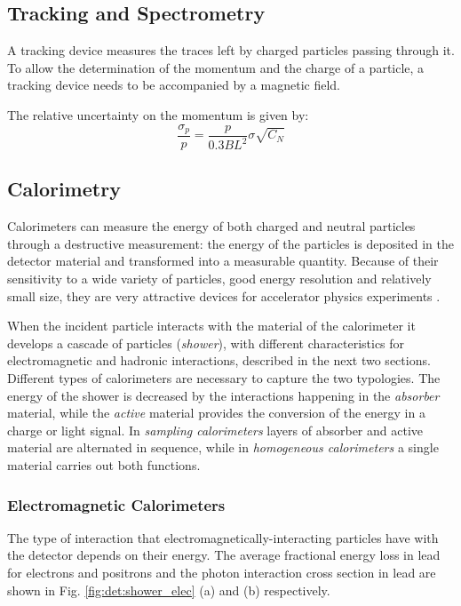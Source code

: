 \subsection{Tracking and Spectrometry}
\label{sec:dec:tracking}
A tracking device measures the traces left by charged particles passing through it. To allow the determination of the momentum and the charge of a particle, a tracking device needs to be accompanied by a magnetic field. 

The relative uncertainty on the momentum is given by:
\begin{equation}
\frac{\sigma_p}{p} = \frac{p}{0.3 B L^2}\sigma \sqrt{C_N}
\end{equation}


\subsection{Calorimetry}
\label{sec:dec:calo}

Calorimeters can measure the energy of both charged and neutral particles through a destructive measurement: the energy of the particles is deposited in the detector material and transformed into a measurable quantity. Because of their sensitivity to a wide variety of particles, good energy resolution and relatively small size, they are very attractive devices for accelerator physics experiments \cite{RevModPhys.75.1243} \cite{Wigmans:2000vf}.

When the incident particle interacts with the material of the calorimeter it develops a cascade of particles (\textit{shower}), with different characteristics for electromagnetic and hadronic interactions, described in the next two sections. Different types of calorimeters are necessary to capture the two typologies. The energy of the shower is decreased by the interactions happening in the \textit{absorber} material, while the \textit{active} material provides the conversion of the energy in a charge or light signal. In \textit{sampling calorimeters} layers of absorber and active material are alternated in sequence, while in \textit{homogeneous calorimeters} a single material carries out both functions.


\subsubsection{Electromagnetic Calorimeters}

The type of interaction that electromagnetically-interacting particles have with the detector depends on their energy. The average fractional energy loss in lead for electrons and positrons and the photon interaction cross section in lead are shown in Fig. \ref{fig:det:shower_elec} (a) and (b) respectively. 

